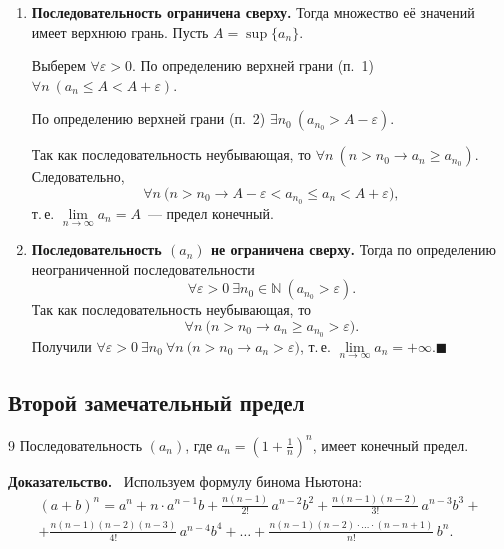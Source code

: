 \documentclass[a4paper,11pt]{article}
\newcommand{\dok}{\textbf{Доказательство.}\ }
\newcommand{\qedr}{\hfill$\blacksquare$}
\begin{document}
\begin{enumerate}[label=\arabic*)]
\item \textbf{Последовательность ограничена сверху.} Тогда множество её значений имеет верхнюю грань.
Пусть $A = \sup \{a_n\}$.

Выберем $\forall \varepsilon > 0$. По определению верхней грани (п.~1) $\forall n\ (a_n \le A < A + \varepsilon)$.

По определению верхней грани (п.~2) $\exists n_0\ (a_{n_0} > A - \varepsilon)$.

Так как последовательность неубывающая, то $\forall n\ (n > n_0 \rightarrow a_n \ge a_{n_0})$. Следовательно,
\[
  \forall n\ \big(n > n_0 \rightarrow A - \varepsilon < a_{n_0} \le a_n < A + \varepsilon\big),
\]
т.\,е. $\lim\limits_{n \to \infty} a_n = A$~--- предел конечный.

\item \textbf{Последовательность $(a_n)$ не ограничена сверху.} Тогда по определению неограниченной
последовательности
\[
  \forall \varepsilon > 0\ \exists n_0 \in \mathbb{N}\ (a_{n_0} > \varepsilon).
\]
Так как последовательность неубывающая, то
\[
  \forall n\ \big(n > n_0 \rightarrow a_n \ge a_{n_0} > \varepsilon\big).
\]
Получили $\forall \varepsilon > 0\ \exists n_0\ \forall n\ \big(n > n_0 \rightarrow a_n > \varepsilon\big)$,
т.\,е. $\lim\limits_{n \to \infty} a_n = +\infty$.\qedr
\end{enumerate}

\subsection{Второй замечательный предел}

\begin{teor}{9}
Последовательность $(a_n)$, где $a_n = \left( 1 + \frac{1}{n} \right)^n$, имеет конечный предел.
\end{teor}

\dok
Используем формулу бинома Ньютона:
\begin{multline*}
  (a + b)^n = a^n + n \cdot a^{n-1}b + \frac{n(n-1)}{2!}\,a^{n-2}b^2
    + \frac{n(n-1)(n-2)}{3!}\,a^{n-3}b^3 + {}\\
  + \frac{n(n-1)(n-2)(n-3)}{4!}\,a^{n-4}b^4 + \ldots
    + \frac{n(n-1)(n-2)\cdot\ldots\cdot(n-n+1)}{n!}\,b^n.
\end{multline*}
\end{document}
